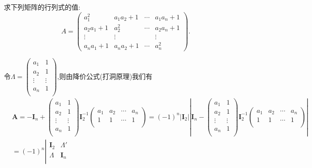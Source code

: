 \documentclass[../../main.tex]{subfiles}
\begin{document}
\begin{example}\label{example:1895}
求下列矩阵的行列式的值:
\[
A = 
\begin{pmatrix}
a_1^2 & a_1a_2 + 1 & \cdots & a_1a_n + 1\\
a_2a_1 + 1 & a_2^2 & \cdots & a_2a_n + 1\\
\vdots & \vdots & & \vdots\\
a_na_1 + 1 & a_na_2 + 1 & \cdots & a_n^2
\end{pmatrix}.
\]
\end{example}
\begin{solution}
令$\boldsymbol{\varLambda }=\left( \begin{matrix}
a_1&		1\\
a_2&		1\\
\vdots&		\vdots\\
a_n&		1\\
\end{matrix} \right)$,则由降价公式(打洞原理)我们有
\begin{align*}
&\boldsymbol{A}=-\boldsymbol{I}_n+\left( \begin{matrix}
a_1&		1\\
a_2&		1\\
\vdots&		\vdots\\
a_n&		1\\
\end{matrix} \right) \boldsymbol{I}_{2}^{-1}\left( \begin{matrix}
a_1&		a_2&		\cdots&		a_n\\
1&		1&		\cdots&		1\\
\end{matrix} \right) =\left( -1 \right) ^n\left| \boldsymbol{I}_2 \right|\left| \boldsymbol{I}_n-\left( \begin{matrix}
a_1&		1\\
a_2&		1\\
\vdots&		\vdots\\
a_n&		1\\
\end{matrix} \right) \boldsymbol{I}_{2}^{-1}\left( \begin{matrix}
a_1&		a_2&		\cdots&		a_n\\
1&		1&		\cdots&		1\\
\end{matrix} \right) \right|
\\
&=\left( -1 \right) ^n\left| \begin{matrix}
\boldsymbol{I}_2&		\boldsymbol{\varLambda }'\\
\boldsymbol{\varLambda }&		\boldsymbol{I}_n\\

\end{matrix}
\end{align*}
\end{solution}
\end{document}
